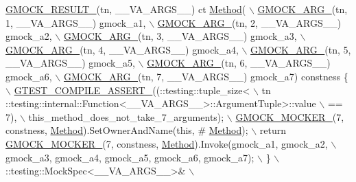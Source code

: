 \begin{DoxyCode}
\hyperlink{gmock-generated-function-mockers_8h_a0e9d94e9c77df84f1103af06feee1077}{GMOCK\_RESULT\_}(tn, \_\_VA\_ARGS\_\_) ct \hyperlink{gmock-spec-builders__test_8cc_a95606368148f3e5aab5db46c32466afd}{Method}( \(\backslash\)
      \hyperlink{gmock-generated-function-mockers_8h_a887575cc1c31158fba808180a10c004f}{GMOCK\_ARG\_}(tn, 1, \_\_VA\_ARGS\_\_) gmock\_a1, \(\backslash\)
      \hyperlink{gmock-generated-function-mockers_8h_a887575cc1c31158fba808180a10c004f}{GMOCK\_ARG\_}(tn, 2, \_\_VA\_ARGS\_\_) gmock\_a2, \(\backslash\)
      \hyperlink{gmock-generated-function-mockers_8h_a887575cc1c31158fba808180a10c004f}{GMOCK\_ARG\_}(tn, 3, \_\_VA\_ARGS\_\_) gmock\_a3, \(\backslash\)
      \hyperlink{gmock-generated-function-mockers_8h_a887575cc1c31158fba808180a10c004f}{GMOCK\_ARG\_}(tn, 4, \_\_VA\_ARGS\_\_) gmock\_a4, \(\backslash\)
      \hyperlink{gmock-generated-function-mockers_8h_a887575cc1c31158fba808180a10c004f}{GMOCK\_ARG\_}(tn, 5, \_\_VA\_ARGS\_\_) gmock\_a5, \(\backslash\)
      \hyperlink{gmock-generated-function-mockers_8h_a887575cc1c31158fba808180a10c004f}{GMOCK\_ARG\_}(tn, 6, \_\_VA\_ARGS\_\_) gmock\_a6, \(\backslash\)
      \hyperlink{gmock-generated-function-mockers_8h_a887575cc1c31158fba808180a10c004f}{GMOCK\_ARG\_}(tn, 7, \_\_VA\_ARGS\_\_) gmock\_a7) constness \{ \hyperlink{gtest-port_8h_ae1f37dc71d5daa6fb49ca1b6047d4a8c}{\(\backslash\)}
\hyperlink{gtest-port_8h_ae1f37dc71d5daa6fb49ca1b6047d4a8c}{    GTEST\_COMPILE\_ASSERT\_}((::testing::tuple\_size<                          \(\backslash\)
        tn ::testing::internal::Function<\_\_VA\_ARGS\_\_>::ArgumentTuple>::value \(\backslash\)
            == 7), \(\backslash\)
        this\_method\_does\_not\_take\_7\_arguments); \hyperlink{gmock-generated-function-mockers_8h_a7d362499e27b1bc3a9806dd3cf58a5b7}{\(\backslash\)}
\hyperlink{gmock-generated-function-mockers_8h_a7d362499e27b1bc3a9806dd3cf58a5b7}{    GMOCK\_MOCKER\_}(7, constness, \hyperlink{gmock-spec-builders__test_8cc_a95606368148f3e5aab5db46c32466afd}{Method}).SetOwnerAndName(\textcolor{keyword}{this}, #
      \hyperlink{gmock-spec-builders__test_8cc_a95606368148f3e5aab5db46c32466afd}{Method}); \(\backslash\)
    return \hyperlink{gmock-generated-function-mockers_8h_a7d362499e27b1bc3a9806dd3cf58a5b7}{GMOCK\_MOCKER\_}(7, constness, \hyperlink{gmock-spec-builders__test_8cc_a95606368148f3e5aab5db46c32466afd}{Method}).Invoke(gmock\_a1, gmock\_a2, \(\backslash\)
        gmock\_a3, gmock\_a4, gmock\_a5, gmock\_a6, gmock\_a7); \(\backslash\)
  \} \(\backslash\)
  ::testing::MockSpec<\_\_VA\_ARGS\_\_>& \(\backslash\)

\end{DoxyCode}
